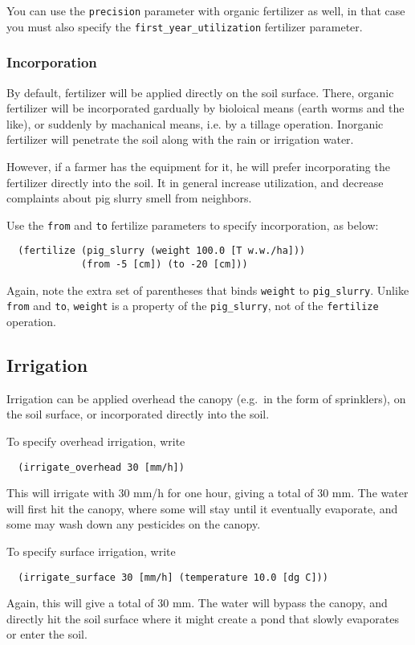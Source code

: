 \documentclass[a4paper,11pt]{article}
\begin{document}
You can use the \texttt{precision} parameter with organic fertilizer
as well, in that case you must also specify the
\texttt{first\_year\_utilization} fertilizer parameter.


\subsubsection{Incorporation}

By default, fertilizer will be applied directly on the soil surface.
There, organic fertilizer will be incorporated gardually by bioloical
means (earth worms and the like), or suddenly by machanical means,
i.e. by a tillage operation.  Inorganic fertilizer will penetrate the
soil along with the rain or irrigation water.

However, if a farmer has the equipment for it, he will prefer
incorporating the fertilizer directly into the soil.  It in general
increase utilization, and decrease complaints about pig slurry smell
from neighbors.

Use the \texttt{from} and \texttt{to} fertilize parameters to specify
incorporation, as below:
\begin{verbatim}
  (fertilize (pig_slurry (weight 100.0 [T w.w./ha]))
             (from -5 [cm]) (to -20 [cm]))
\end{verbatim}
Again, note the extra set of parentheses that binds \texttt{weight} to
\texttt{pig\_slurry}.  Unlike \texttt{from} and \texttt{to},
\texttt{weight} is a property of the \texttt{pig\_slurry}, not of the
\texttt{fertilize} operation.

\subsection{Irrigation}
\label{sec:irrigation}

Irrigation can be applied overhead the canopy (e.g.\ in the form of
sprinklers), on the soil surface, or incorporated directly into the
soil. 

To specify overhead irrigation, write
\begin{verbatim}
  (irrigate_overhead 30 [mm/h])
\end{verbatim}
This will irrigate with 30 mm/h for one hour, giving a total of 30 mm.
The water will first hit the canopy, where some will stay until it
eventually evaporate, and some may wash down any pesticides on the
canopy.

To specify surface irrigation, write
\begin{verbatim}
  (irrigate_surface 30 [mm/h] (temperature 10.0 [dg C]))
\end{verbatim}
Again, this will give a total of 30 mm.  The water will bypass the
canopy, and directly hit the soil surface where it might create a pond
that slowly evaporates or enter the soil.
\end{document}
